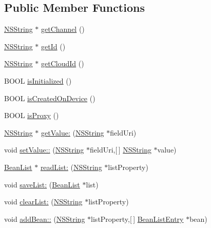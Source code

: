 \subsection*{\-Public \-Member \-Functions}
\begin{DoxyCompactItemize}
\item 
\hyperlink{class_n_s_string}{\-N\-S\-String} $\ast$ \hyperlink{interface_mobile_bean_ae44c212a23234c2d150f5b5308da06c0}{get\-Channel} ()
\item 
\hyperlink{class_n_s_string}{\-N\-S\-String} $\ast$ \hyperlink{interface_mobile_bean_a5b46efc0a2f36f7adacbb4110a12db9c}{get\-Id} ()
\item 
\hyperlink{class_n_s_string}{\-N\-S\-String} $\ast$ \hyperlink{interface_mobile_bean_a0f8fe95a97c391a12de36c2f72357a77}{get\-Cloud\-Id} ()
\item 
\-B\-O\-O\-L \hyperlink{interface_mobile_bean_adf324a1d195f07535650a2f9c4e72c2e}{is\-Initialized} ()
\item 
\-B\-O\-O\-L \hyperlink{interface_mobile_bean_a5ef8e84a0ccc61f65913e6e83dd1d907}{is\-Created\-On\-Device} ()
\item 
\-B\-O\-O\-L \hyperlink{interface_mobile_bean_a9c4154a3d86f842bb03cf4053d78bd40}{is\-Proxy} ()
\item 
\hyperlink{class_n_s_string}{\-N\-S\-String} $\ast$ \hyperlink{interface_mobile_bean_a5ac15c5323dd5de0be89a24be9d9bc4f}{get\-Value\-:} (\hyperlink{class_n_s_string}{\-N\-S\-String} $\ast$field\-Uri)
\item 
void \hyperlink{interface_mobile_bean_aa2e9dee169619a886bfbf64533fd4b10}{set\-Value\-::} (\hyperlink{class_n_s_string}{\-N\-S\-String} $\ast$field\-Uri,\mbox{[}$\,$\mbox{]} \hyperlink{class_n_s_string}{\-N\-S\-String} $\ast$value)
\item 
\hyperlink{interface_bean_list}{\-Bean\-List} $\ast$ \hyperlink{interface_mobile_bean_a1f36e2a5b9ecb363c38973df1618e237}{read\-List\-:} (\hyperlink{class_n_s_string}{\-N\-S\-String} $\ast$list\-Property)
\item 
void \hyperlink{interface_mobile_bean_af59eea7c76a2397dbe4e5c44a8cb5275}{save\-List\-:} (\hyperlink{interface_bean_list}{\-Bean\-List} $\ast$list)
\item 
void \hyperlink{interface_mobile_bean_a9431c353027aa9660a8f8eeb894cc1e8}{clear\-List\-:} (\hyperlink{class_n_s_string}{\-N\-S\-String} $\ast$list\-Property)
\item 
void \hyperlink{interface_mobile_bean_a08c5cfccb1ef6baa7a1884fe711e359f}{add\-Bean\-::} (\hyperlink{class_n_s_string}{\-N\-S\-String} $\ast$list\-Property,\mbox{[}$\,$\mbox{]} \hyperlink{interface_bean_list_entry}{\-Bean\-List\-Entry} $\ast$bean)

\end{DoxyCompactItemize}
